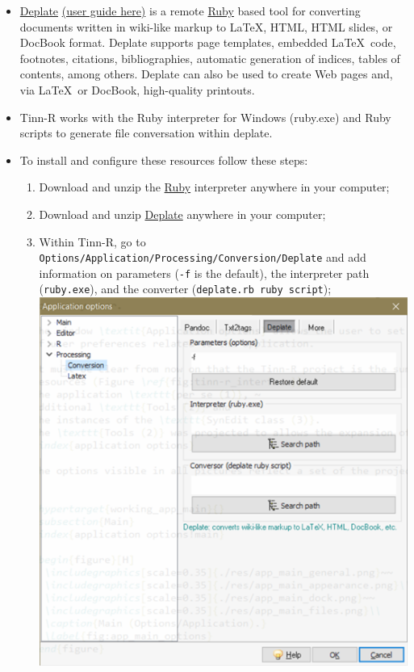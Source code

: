 \begin{itemize}
  \item \href{http://deplate.sourceforge.net/}{Deplate}
    \href{http://deplate.sourceforge.net/deplate.html}{(user guide here)}
    is a remote
    \href{http://www.ruby-lang.org/en/}{Ruby} based tool for
    converting documents written in wiki-like markup to \LaTeX, HTML, HTML slides,
    or DocBook format. Deplate supports page templates, embedded \LaTeX ~code,
    footnotes, citations, bibliographies, automatic generation of indices, tables
    of contents, among others. Deplate can also be used to create Web pages and,
    via \LaTeX ~or DocBook, high-quality printouts.

  \item Tinn-R works with the Ruby interpreter for Windows (ruby.exe) and Ruby
    scripts to generate file conversation within deplate.

  \item To install and configure these resources follow these steps:
    \begin{enumerate}
      \item Download and unzip the
        \href{http://www.ruby-lang.org/en/}{Ruby}
        interpreter anywhere in your computer;
      \item Download and unzip
        \href{http://deplate.sourceforge.net/Download.php}{Deplate}
        anywhere in your computer;
      \item Within Tinn-R, go to \texttt{Options/Application/Processing/Conversion/Deplate}
        and add information on parameters (\texttt{-f} is the default),
        the interpreter path (\texttt{ruby.exe}), and the converter
        (\texttt{deplate.rb ruby script});\\

        \includegraphics[scale=0.50]{./res/app_processing_conversion_deplate.png}\\
    \end{enumerate}
\end{itemize}

